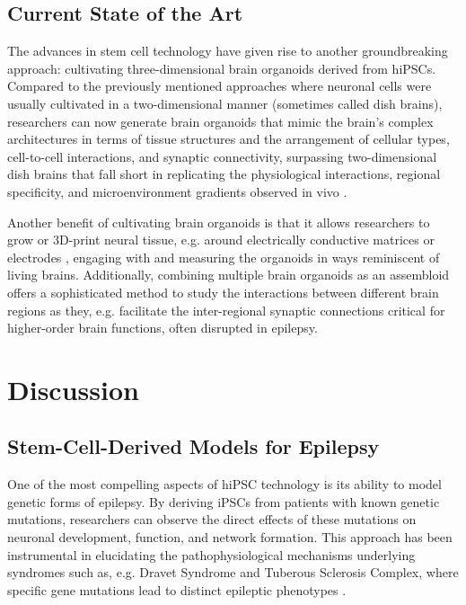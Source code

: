 \documentclass[10pt]{article}
\begin{document}
\begin{sloppypar}
  \subsection{Current State of the Art}
  \label{sec:current-state-of-the-art}

  The advances in stem cell technology have given rise to another groundbreaking approach: cultivating three-dimensional brain organoids derived from hiPSCs. Compared to the previously mentioned approaches where neuronal cells were usually cultivated in a two-dimensional manner (sometimes called dish brains), researchers can now generate brain organoids that mimic the brain’s complex architectures in terms of tissue structures and the arrangement of cellular types, cell-to-cell interactions, and synaptic connectivity, surpassing two-dimensional dish brains that fall short in replicating the physiological interactions, regional specificity, and microenvironment gradients observed in vivo \citep{clevers_modeling_2016, wang_modeling_2018}.

  Another benefit of cultivating brain organoids is that it allows researchers to grow or 3D-print neural tissue, e.g. around electrically conductive matrices or electrodes \citep{yao_3d_2023}, engaging with and measuring the organoids in ways reminiscent of living brains. Additionally, combining multiple brain organoids as an assembloid offers a sophisticated method to study the interactions between different brain regions \citep{sloan_generation_2018} as they, e.g. facilitate the inter-regional synaptic connections critical for higher-order brain functions, often disrupted in epilepsy.

  \section{Discussion}
  \label{sec:discussion}


  \subsection{Stem-Cell-Derived Models for Epilepsy}
  \label{sec:stem-cell-derived-models-for-epilepsy}

  One of the most compelling aspects of hiPSC technology is its ability to model genetic forms of epilepsy. By deriving iPSCs from patients with known genetic mutations, researchers can observe the direct effects of these mutations on neuronal development, function, and network formation. This approach has been instrumental in elucidating the pathophysiological mechanisms underlying syndromes such as, e.g. Dravet Syndrome and Tuberous Sclerosis Complex, where specific gene mutations lead to distinct epileptic phenotypes \citep{jiao_modeling_2013, nadadhur_neuron-glia_2019}.


\end{sloppypar}
\end{document}
